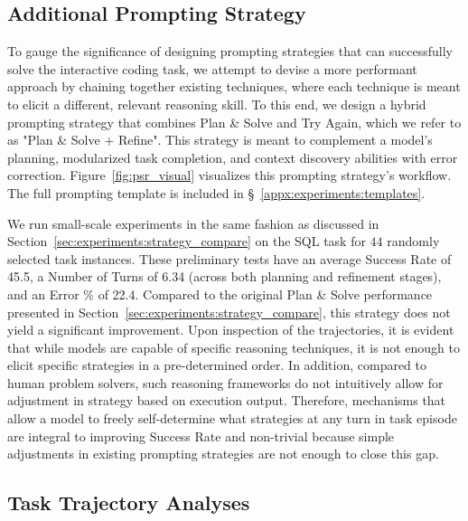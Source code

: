

\subsection{Additional Prompting Strategy}
\label{appx:experiments:additional_strategies}

To gauge the significance of designing prompting strategies that can successfully solve the interactive coding task, we attempt to devise a more performant approach by chaining together existing techniques, where each technique is meant to elicit a different, relevant reasoning skill. To this end, we design a hybrid prompting strategy that combines Plan \& Solve and Try Again, which we refer to as "Plan \& Solve + Refine". This strategy is meant to complement a model's planning, modularized task completion, and context discovery abilities with error correction. Figure~\ref{fig:psr_visual} visualizes this prompting strategy's workflow. The full prompting template is included in \S~\ref{appx:experiments:templates}.



We run small-scale experiments in the same fashion as discussed in Section~\ref{sec:experiments:strategy_compare} on the SQL task for $44$ randomly selected task instances. These preliminary tests have an average Success Rate of 45.5, a Number of Turns of 6.34 (across both planning and refinement stages), and an Error \% of 22.4. Compared to the original Plan \& Solve performance presented in Section~\ref{sec:experiments:strategy_compare}, this strategy does not yield a significant improvement. Upon inspection of the trajectories, it is evident that while models are capable of specific reasoning techniques, it is not enough to elicit specific strategies in a pre-determined order. In addition, compared to human problem solvers, such reasoning frameworks do not intuitively allow for adjustment in strategy based on execution output. Therefore, mechanisms that allow a model to freely self-determine what strategies at any turn in task episode are integral to improving Success Rate and non-trivial because simple adjustments in existing prompting strategies are not enough to close this gap. 

\subsection{Task Trajectory Analyses}
\label{appx:experiments:trajectory_analyses}

